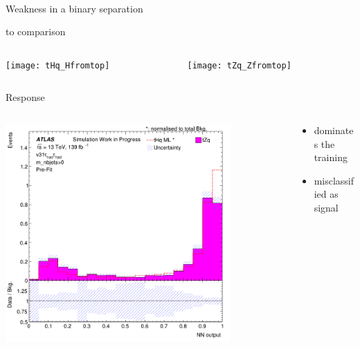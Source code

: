 \begin{frame}
    \begin{center}
        \Huge \tZq \\ Weakness in a binary separation
    \end{center}
\end{frame}

\begin{frame}{\tHq to \tZq comparison}
    \begin{columns}
        \begin{column}{0.5\textwidth}
            \texttt{[image: tHq\_Hfromtop]}
        \end{column}
        \begin{column}{0.5\textwidth}
            \texttt{[image: tZq\_Zfromtop]}
        \end{column}
    \end{columns}
\end{frame}

\begin{frame}{Response}
    \begin{columns}
        \begin{column}{0.7\textwidth}
            \centering \includegraphics[width=0.81\textwidth]{tZq_problem}
        \end{column}
        \begin{column}{0.3\textwidth}
            \begin{itemize}
                \item \ttbar dominates the training
                \item \tZq misclassified as signal
            \end{itemize}
        \end{column}
    \end{columns}
\end{frame}